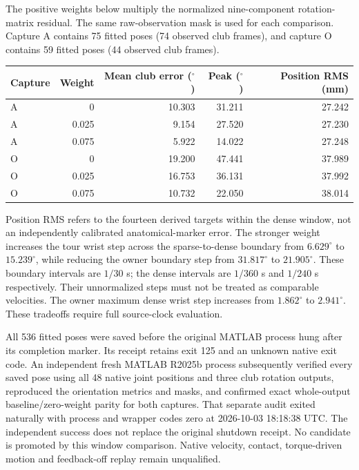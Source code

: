 \documentclass[11pt,a4paper]{article}
\begin{document}
The positive weights below multiply the normalized nine-component
rotation-matrix residual. The same raw-observation mask is used for each
comparison. Capture A contains 75 fitted poses (74 observed club frames),
and capture O contains 59 fitted poses (44 observed club frames).
\begin{center}
\begin{tabular}{lrrrr}
\hline
Capture & Weight & Mean club error ($^\circ$) & Peak ($^\circ$) & Position RMS (mm)\\
\hline
A & 0 & 10.303 & 31.211 & 27.242\\
A & 0.025 & 9.154 & 27.520 & 27.230\\
A & 0.075 & 5.922 & 14.022 & 27.248\\
O & 0 & 19.200 & 47.441 & 37.989\\
O & 0.025 & 16.753 & 36.131 & 37.992\\
O & 0.075 & 10.732 & 22.050 & 38.014\\
\hline
\end{tabular}
\end{center}
Position RMS refers to the fourteen derived targets within the dense
window, not an independently calibrated anatomical-marker error.
The stronger weight increases the tour wrist step across the sparse-to-dense
boundary from $6.629^\circ$ to $15.239^\circ$, while reducing the owner
boundary step from $31.817^\circ$ to $21.905^\circ$. These boundary intervals
are $1/30$ s; the dense intervals are $1/360$ s and $1/240$ s respectively.
Their unnormalized steps must not be treated as comparable velocities.
The owner maximum dense wrist step increases from $1.862^\circ$ to
$2.941^\circ$. These tradeoffs require full source-clock evaluation.

All 536 fitted poses were saved before the original MATLAB process hung
after its completion marker. Its receipt retains exit 125 and an unknown
native exit code. An independent fresh MATLAB R2025b process subsequently
verified every saved pose using all 48 native joint positions and three
club rotation outputs, reproduced the orientation metrics and masks,
and confirmed exact whole-output baseline/zero-weight parity for both
captures. That separate audit exited naturally with process and wrapper
codes zero at 2026-10-03 18:18:38 UTC. The independent success does not
replace the original shutdown receipt. No candidate is promoted by this
window comparison. Native velocity, contact, torque-driven motion and
feedback-off replay remain unqualified.
\end{document}
